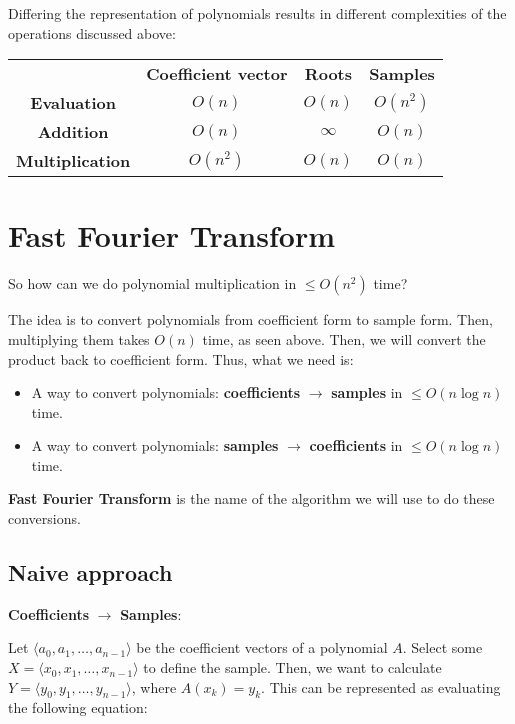 \documentclass[11pt]{article}
\theoremstyle{plain}
\theoremstyle{definition}
\begin{document}
Differing the representation of polynomials results in different complexities of the operations 
discussed above:

\begin{center}
    \begin{tabular}{ c c c c }
        & \textbf{Coefficient vector} & \textbf{Roots} & \textbf{Samples} \\ 
        \textbf{Evaluation} & $O(n)$ & $O(n)$ & $O(n^2)$\\
        \textbf{Addition} & $O(n)$ & $\infty$ & $O(n)$\\
        \textbf{Multiplication} & $O(n^2)$ & $O(n)$ & $O(n)$\\
    \end{tabular}
\end{center}

\section{Fast Fourier Transform}

So how can we do polynomial multiplication in $\leq O(n^2)$ time?

The idea is to convert polynomials from coefficient form to sample form. Then, multiplying them takes 
$O(n)$ time, as seen above. Then, we will convert the product back to coefficient form. Thus, what
we need is:
\begin{itemize}
    \item A way to convert polynomials: \textbf{coefficients} $\rightarrow$ \textbf{samples} in 
        $\leq O(n\log n)$ time.
    \item A way to convert polynomials: \textbf{samples} $\rightarrow$ \textbf{coefficients} in 
        $\leq O(n\log n)$ time.
\end{itemize}

\textbf{Fast Fourier Transform} is the name of the algorithm we will use to do these conversions.

\subsection{Naive approach}

\textbf{Coefficients} $\rightarrow$ \textbf{Samples}:

Let $\langle a_0, a_1, \ldots, a_{n-1} \rangle$ be the coefficient vectors of a polynomial $A$.
Select some $X = \langle x_0, x_1, \ldots, x_{n-1} \rangle$ to define the sample. Then, we want to calculate
$Y = \langle y_0, y_1, \ldots, y_{n-1} \rangle$, where $A(x_k) = y_k$. This can be represented as 
evaluating the following equation:
\end{document}
